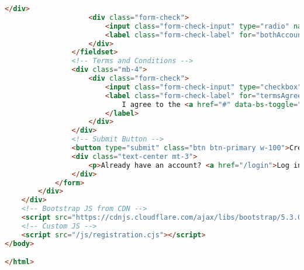 \begin{lstlisting}[language=HTML]
                    </div>
                    <div class="form-check">
                        <input class="form-check-input" type="radio" name="accountType" id="bothAccounts" value="both">
                        <label class="form-check-label" for="bothAccounts">Both Checking & Savings</label>
                    </div>
                </fieldset>
                <!-- Terms and Conditions -->
                <div class="mb-4">
                    <div class="form-check">
                        <input class="form-check-input" type="checkbox" id="termsAgreement" required>
                        <label class="form-check-label" for="termsAgreement">
                            I agree to the <a href="#" data-bs-toggle="modal" data-bs-target="#termsModal">Terms and Conditions</a>
                        </label>
                    </div>
                </div>
                <!-- Submit Button -->
                <button type="submit" class="btn btn-primary w-100">Create Account</button>
                <div class="text-center mt-3">
                    <p>Already have an account? <a href="/login">Log in</a></p>
                </div>
            </form>
        </div>
    </div>
    <!-- Bootstrap JS from CDN -->
    <script src="https://cdnjs.cloudflare.com/ajax/libs/bootstrap/5.3.0/js/bootstrap.bundle.min.js"></script>
    <!-- Custom JS -->
    <script src="/js/registration.cjs"></script>
</body>

</html>

\end{lstlisting}

